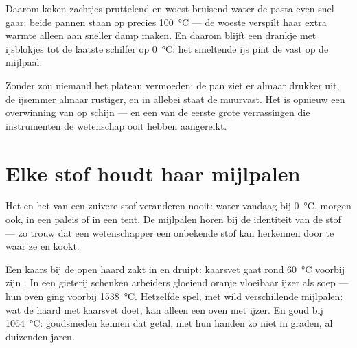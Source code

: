 \begin{example}\label{ex:g4:changes-of-state:kitchen}
Daarom koken zachtjes pruttelend en woest bruisend water de pasta even
snel gaar: beide pannen staan op precies \qty{100}{\celsius} --- de
woeste verspilt haar extra warmte alleen aan sneller damp maken. En
daarom blijft een drankje met ijsblokjes tot de laatste schilfer op
\qty{0}{\celsius}: het smeltende ijs pint de  vast op de
mijlpaal.
\end{example}

\begin{remark}\label{rem:g4:changes-of-state:invisible}
Zonder  zou niemand het plateau vermoeden: de pan ziet er
almaar drukker uit, de ijsemmer almaar rustiger, en in allebei staat
de  muurvast. Het is opnieuw een overwinning van  op
schijn --- en een van de eerste grote verrassingen die instrumenten de
wetenschap ooit hebben aangereikt.
\end{remark}

\section{Elke stof houdt haar mijlpalen}

\begin{proposition}\label{prop:g4:changes-of-state:identity}
Het  en het  van een zuivere stof veranderen
nooit: water  vandaag bij \qty{0}{\celsius}, morgen ook, in een
paleis of in een tent. De mijlpalen horen bij de identiteit van de
stof --- zo trouw dat een wetenschapper een onbekende stof kan
herkennen door te  waar ze  en kookt.
\end{proposition}

\begin{example}\label{ex:g4:changes-of-state:foundry}
Een kaars bij de open haard zakt in en druipt: kaarsvet gaat rond
\qty{60}{\celsius} voorbij zijn . In een gieterij schenken
arbeiders gloeiend oranje vloeibaar ijzer als soep --- hun oven ging
voorbij \qty{1538}{\celsius}. Hetzelfde spel, met wild verschillende
mijlpalen: wat de haard met kaarsvet doet, kan alleen een oven met
ijzer. En goud  bij \qty{1064}{\celsius}: goudsmeden kennen dat
getal, met hun handen zo niet in graden, al duizenden jaren.
\end{example}

